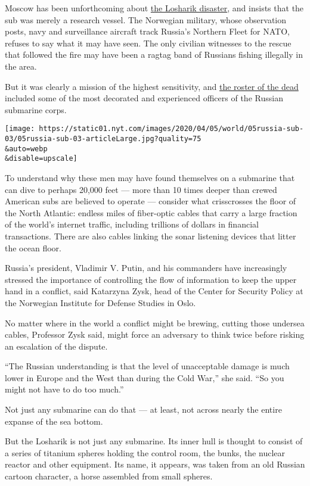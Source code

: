 Moscow has been unforthcoming about
\href{https://www.nytimes.com/2019/07/04/world/europe/russia-nuclear-sub-fire.html}{the
Losharik disaster}, and insists that the sub was merely a research
vessel. The Norwegian military, whose observation posts, navy and
surveillance aircraft track Russia's Northern Fleet for NATO, refuses to
say what it may have seen. The only civilian witnesses to the rescue
that followed the fire may have been a ragtag band of Russians fishing
illegally in the area.

But it was clearly a mission of the highest sensitivity, and
\href{https://function.mil.ru/news_page/country/more.htm?id=12239672@egNews}{the
roster of the dead} included some of the most decorated and experienced
officers of the Russian submarine corps.

\texttt{[image: https://static01.nyt.com/images/2020/04/05/world/05russia-sub-03/05russia-sub-03-articleLarge.jpg?quality=75\\\&auto=webp\\\&disable=upscale]}

To understand why these men may have found themselves on a submarine
that can dive to perhaps 20,000 feet --- more than 10 times deeper than
crewed American subs are believed to operate --- consider what
crisscrosses the floor of the North Atlantic: endless miles of
fiber-optic cables that carry a large fraction of the world's internet
traffic, including trillions of dollars in financial transactions. There
are also cables linking the sonar listening devices that litter the
ocean floor.

Russia's president, Vladimir V. Putin, and his commanders have
increasingly stressed the importance of controlling the flow of
information to keep the upper hand in a conflict, said Katarzyna Zysk,
head of the Center for Security Policy at the Norwegian Institute for
Defense Studies in Oslo.

No matter where in the world a conflict might be brewing, cutting those
undersea cables, Professor Zysk said, might force an adversary to think
twice before risking an escalation of the dispute.

``The Russian understanding is that the level of unacceptable damage is
much lower in Europe and the West than during the Cold War,'' she said.
``So you might not have to do too much.''

Not just any submarine can do that --- at least, not across nearly the
entire expanse of the sea bottom.

But the Losharik is not just any submarine. Its inner hull is thought to
consist of a series of titanium spheres holding the control room, the
bunks, the nuclear reactor and other equipment. Its name, it appears,
was taken from an old Russian cartoon character, a horse assembled from
small spheres.

